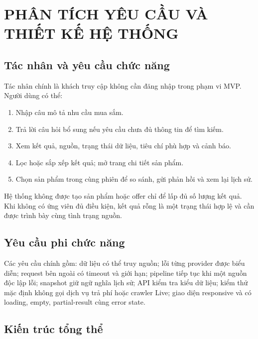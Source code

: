\chapter{PHÂN TÍCH YÊU CẦU VÀ THIẾT KẾ HỆ THỐNG}

\section{Tác nhân và yêu cầu chức năng}

Tác nhân chính là khách truy cập không cần đăng nhập trong phạm vi MVP. Người dùng có thể:
\begin{enumerate}
  \item Nhập câu mô tả nhu cầu mua sắm.
  \item Trả lời câu hỏi bổ sung nếu yêu cầu chưa đủ thông tin để tìm kiếm.
  \item Xem kết quả, nguồn, trạng thái dữ liệu, tiêu chí phù hợp và cảnh báo.
  \item Lọc hoặc sắp xếp kết quả; mở trang chi tiết sản phẩm.
  \item Chọn sản phẩm trong cùng phiên để so sánh, gửi phản hồi và xem lại lịch sử.
\end{enumerate}

Hệ thống không được tạo sản phẩm hoặc offer chỉ để lấp đủ số lượng kết quả. Khi không có ứng viên đủ điều kiện, kết quả rỗng là một trạng thái hợp lệ và cần được trình bày cùng tình trạng nguồn.

\section{Yêu cầu phi chức năng}

Các yêu cầu chính gồm: dữ liệu có thể truy nguồn; lỗi từng provider được biểu diễn; request bên ngoài có timeout và giới hạn; pipeline tiếp tục khi một nguồn độc lập lỗi; snapshot giữ ngữ nghĩa lịch sử; API kiểm tra kiểu dữ liệu; kiểm thử mặc định không gọi dịch vụ trả phí hoặc crawler Live; giao diện responsive và có loading, empty, partial-result cùng error state.

\section{Kiến trúc tổng thể}

